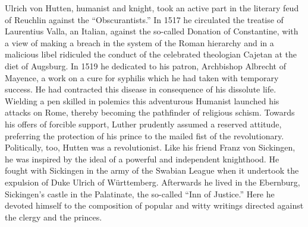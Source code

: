 Ulrich von Hutten, humanist and knight, took an active part in
the literary feud of Reuchlin against the “Obscurantists.” In 1517
he circulated the treatise of Laurentius Valla, an Italian, against
the so-called Donation of Constantine, with a view of making a
breach in the system of the Roman hierarchy and in a malicious
libel ridiculed the conduct of the celebrated theologian Cajetan at
the diet of Augsburg. In 1519 he dedicated to his patron, Archbishop Albrecht
of Mayence, a work on a cure for syphilis which he
had taken with temporary success. He had contracted this disease in
consequence of his dissolute life. Wielding a pen skilled in polemics
this adventurous Humanist launched his attacks on Rome, thereby
becoming the pathfinder of religious schism. Towards his offers of
forcible support, Luther prudently assumed a reserved attitude, preferring
the protection of his prince to the mailed fist of the revolutionary.
Politically, too, Hutten was a revolutionist. Like his
friend Franz von Sickingen, he was inspired by the ideal of a powerful
and independent knighthood. He fought with Sickingen in
the army of the Swabian League when it undertook the expulsion
of Duke Ulrich of Württemberg. Afterwards he lived in the Ebernburg,
Sickingen’s castle in the Palatinate, the so-called “Inn of Justice.”
Here he devoted himself to the composition of popular
and witty writings directed against the clergy and the princes.

